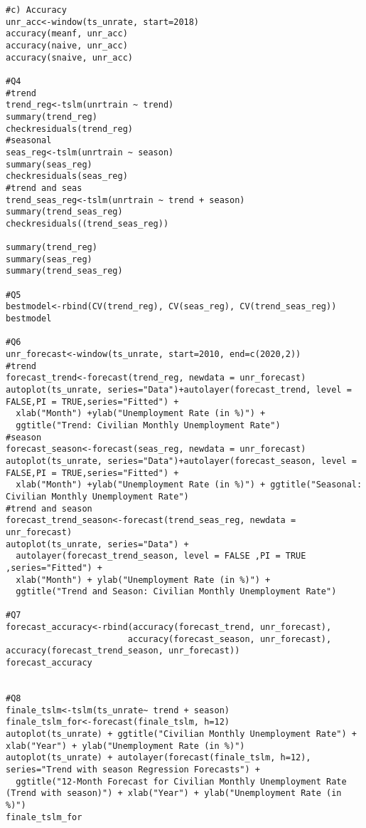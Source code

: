 \documentclass[12pt]{article}
\begin{document}
\begin{verbatim}
#c) Accuracy
unr_acc<-window(ts_unrate, start=2018)
accuracy(meanf, unr_acc)
accuracy(naive, unr_acc)
accuracy(snaive, unr_acc)

#Q4
#trend
trend_reg<-tslm(unrtrain ~ trend)
summary(trend_reg)
checkresiduals(trend_reg)
#seasonal
seas_reg<-tslm(unrtrain ~ season)
summary(seas_reg)
checkresiduals(seas_reg)
#trend and seas
trend_seas_reg<-tslm(unrtrain ~ trend + season)
summary(trend_seas_reg)
checkresiduals((trend_seas_reg))

summary(trend_reg)
summary(seas_reg)
summary(trend_seas_reg)

#Q5
bestmodel<-rbind(CV(trend_reg), CV(seas_reg), CV(trend_seas_reg))
bestmodel

#Q6
unr_forecast<-window(ts_unrate, start=2010, end=c(2020,2)) 
#trend
forecast_trend<-forecast(trend_reg, newdata = unr_forecast)
autoplot(ts_unrate, series="Data")+autolayer(forecast_trend, level = FALSE,PI = TRUE,series="Fitted") +
  xlab("Month") +ylab("Unemployment Rate (in %)") +
  ggtitle("Trend: Civilian Monthly Unemployment Rate")
#season
forecast_season<-forecast(seas_reg, newdata = unr_forecast)
autoplot(ts_unrate, series="Data")+autolayer(forecast_season, level = FALSE,PI = TRUE,series="Fitted") +
  xlab("Month") +ylab("Unemployment Rate (in %)") + ggtitle("Seasonal: Civilian Monthly Unemployment Rate")
#trend and season
forecast_trend_season<-forecast(trend_seas_reg, newdata = unr_forecast)
autoplot(ts_unrate, series="Data") +
  autolayer(forecast_trend_season, level = FALSE ,PI = TRUE ,series="Fitted") +
  xlab("Month") + ylab("Unemployment Rate (in %)") +
  ggtitle("Trend and Season: Civilian Monthly Unemployment Rate")

#Q7
forecast_accuracy<-rbind(accuracy(forecast_trend, unr_forecast),
                        accuracy(forecast_season, unr_forecast), accuracy(forecast_trend_season, unr_forecast))
forecast_accuracy


#Q8
finale_tslm<-tslm(ts_unrate~ trend + season)
finale_tslm_for<-forecast(finale_tslm, h=12)
autoplot(ts_unrate) + ggtitle("Civilian Monthly Unemployment Rate") + xlab("Year") + ylab("Unemployment Rate (in %)")
autoplot(ts_unrate) + autolayer(forecast(finale_tslm, h=12), series="Trend with season Regression Forecasts") +
  ggtitle("12-Month Forecast for Civilian Monthly Unemployment Rate (Trend with season)") + xlab("Year") + ylab("Unemployment Rate (in %)")
finale_tslm_for

\end{verbatim}
\end{document}
